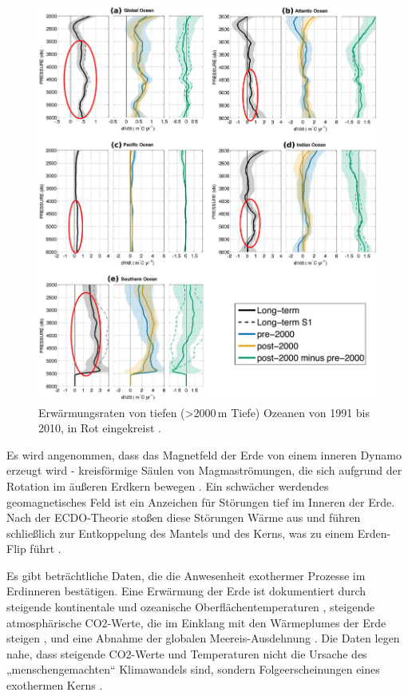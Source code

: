 \documentclass[10pt,twocolumn,letterpaper]{article}
\begin{document}
\begin{figure}[t]
\begin{center}
   \includegraphics[width=1\linewidth]{ocean-highlight.jpg}
\end{center}
   \caption{Erwärmungsraten von tiefen (>$2000\,\text{m}$ Tiefe) Ozeanen von 1991 bis 2010, in Rot eingekreist \cite{132}.}
\label{fig:15}
\label{fig:onecol}
\end{figure}

Es wird angenommen, dass das Magnetfeld der Erde von einem inneren Dynamo erzeugt wird - kreisförmige Säulen von Magmaströmungen, die sich aufgrund der Rotation im äußeren Erdkern bewegen \cite{123}. Ein schwächer werdendes geomagnetisches Feld ist ein Anzeichen für Störungen tief im Inneren der Erde. Nach der ECDO-Theorie stoßen diese Störungen Wärme aus und führen schließlich zur Entkoppelung des Mantels und des Kerns, was zu einem Erden-Flip führt \cite{1}.

Es gibt beträchtliche Daten, die die Anwesenheit exothermer Prozesse im Erdinneren bestätigen. Eine Erwärmung der Erde ist dokumentiert durch steigende kontinentale und ozeanische Oberflächentemperaturen \cite{127,128}, steigende atmosphärische CO2-Werte, die im Einklang mit den Wärmeplumes der Erde steigen \cite{129,130}, und eine Abnahme der globalen Meereis-Ausdehnung \cite{131}. Die Daten legen nahe, dass steigende CO2-Werte und Temperaturen nicht die Ursache des „menschengemachten“ Klimawandels sind, sondern Folgeerscheinungen eines exothermen Kerns \cite{129}.
\end{document}
